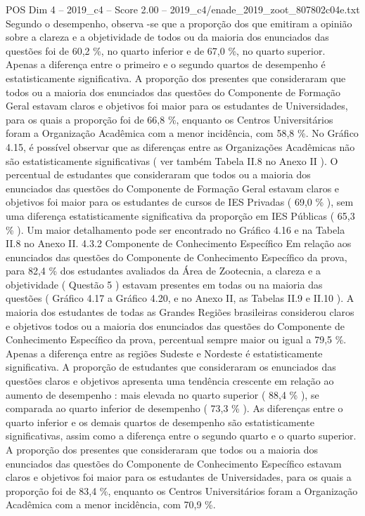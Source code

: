 \begin{textsample}{POS Dim 4 – 2019\_c4 – Score 2.00 – 2019\_c4/enade\_2019\_zoot\_807802c04e.txt}
Segundo o desempenho, observa -se que a proporção dos que emitiram a opinião sobre a clareza e a objetividade de todos ou da maioria dos enunciados das questões foi de 60,2 \%, no quarto inferior e de 67,0 \%, no quarto superior.
Apenas a diferença entre o primeiro e o segundo quartos de desempenho é estatisticamente significativa.
A proporção dos presentes que consideraram que todos ou a maioria dos enunciados das questões do Componente de Formação Geral estavam claros e objetivos foi maior para os estudantes de Universidades, para os quais a proporção foi de 66,8 \%, enquanto os Centros Universitários foram a Organização Acadêmica com a menor incidência, com 58,8 \%.
No Gráfico 4.15, é possível observar que as diferenças entre as Organizações Acadêmicas não são estatisticamente significativas ( ver também Tabela II.8 no Anexo II ).
O percentual de estudantes que consideraram que todos ou a maioria dos enunciados das questões do Componente de Formação Geral estavam claros e objetivos foi maior para os estudantes de cursos de IES Privadas ( 69,0 \% ), sem uma diferença estatisticamente significativa da proporção em IES Públicas ( 65,3 \% ).
Um maior detalhamento pode ser encontrado no Gráfico 4.16 e na Tabela II.8 no Anexo II. 4.3.2 Componente de Conhecimento Específico Em relação aos enunciados das questões do Componente de Conhecimento Específico da prova, para 82,4 \% dos estudantes avaliados da Área de Zootecnia, a clareza e a objetividade ( Questão 5 ) estavam presentes em todas ou na maioria das questões ( Gráfico 4.17 a Gráfico 4.20, e no Anexo II, as Tabelas II.9 e II.10 ).
A maioria dos estudantes de todas as Grandes Regiões brasileiras considerou claros e objetivos todos ou a maioria dos enunciados das questões do Componente de Conhecimento Específico da prova, percentual sempre maior ou igual a 79,5 \%.
Apenas a diferença entre as regiões Sudeste e Nordeste é estatisticamente significativa.
A proporção de estudantes que consideraram os enunciados das questões claros e objetivos apresenta uma tendência crescente em relação ao aumento de desempenho : mais elevada no quarto superior ( 88,4 \% ), se comparada ao quarto inferior de desempenho ( 73,3 \% ).
As diferenças entre o quarto inferior e os demais quartos de desempenho são estatisticamente significativas, assim como a diferença entre o segundo quarto e o quarto superior.
A proporção dos presentes que consideraram que todos ou a maioria dos enunciados das questões do Componente de Conhecimento Específico estavam claros e objetivos foi maior para os estudantes de Universidades, para os quais a proporção foi de 83,4 \%, enquanto os Centros Universitários foram a Organização Acadêmica com a menor incidência, com 70,9 \%.

\end{textsample}
